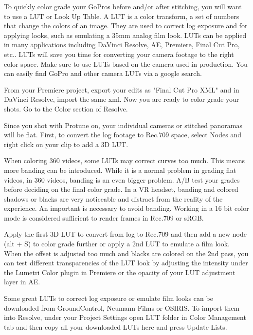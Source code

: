 \begin{fullwidth}

To quickly color grade your GoPros before and/or after stitching, you will want to use a LUT or Look Up Table. A LUT is a color transform, a set of numbers that change the colors of an image. They are used to correct log exposure and for applying looks, such as emulating a 35mm analog film look. LUTs can be applied in many applications including DaVinci Resolve, AE, Premiere, Final Cut Pro, etc.. LUTs will save you time for converting your camera footage to the right color space. Make sure to use LUTs based on the camera used in production. You can easily find GoPro and other camera LUTs via a google search.

From your Premiere project, export your edits as "Final Cut Pro XML" and in DaVinci Resolve, import the same xml. Now you are ready to color grade your shots. Go to the Color section of Resolve.


Since you shot with Protune on, your individual cameras or stitched panoramas will be flat. First, to convert the log footage to Rec.709 space, select Nodes and right click on your clip to add a 3D LUT. 


When coloring 360 videos, some LUTs may correct curves too much. This means more banding can be introduced. While it is a normal problem in grading flat videos, in 360 videos, banding is an even bigger problem. A/B test your grades before deciding on the final color grade. In a VR headset, banding and colored shadows or blacks are very noticeable and distract from the reality of the experience. An important \textbf{} is necessary to avoid banding. Working in a 16 bit color mode is considered sufficient to render frames in Rec.709 or sRGB.


Apply the first 3D LUT to convert from log to Rec.709 and then add a new node (alt + S) to color grade further or apply a 2nd LUT to emulate a film look. When the offset is adjusted too much and blacks are colored on the 2nd pass, you can test different transparencies of the LUT look by adjusting the intensity under the Lumetri Color plugin in Premiere or the opacity of your LUT adjustment layer in AE.


\tip Some great LUTs to correct log exposure or emulate film looks can be downloaded from GroundControl, Neumann Films or OSIRIS. To import them into Resolve, under your Project Settings open LUT folder in Color Management tab and then copy all your downloaded LUTs here and press Update Lists.  


\end{fullwidth}
